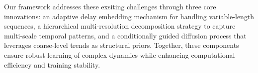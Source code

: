 




Our framework addresses these exsiting challenges through three core innovations: an adaptive delay embedding mechanism for handling variable-length sequences, a hierarchical multi-resolution decomposition strategy to capture multi-scale temporal patterns, and a conditionally guided diffusion process that leverages coarse-level trends as structural priors. Together, these components ensure robust learning of complex dynamics while enhancing computational efficiency and training stability.










